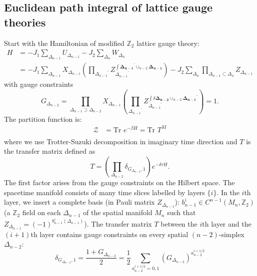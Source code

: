 \documentclass[12pt]{article}
\newcommand{\ZZ}{{\mathbb Z}}
\begin{document}
\subsection{Euclidean path integral of lattice gauge theories}

Start with the Hamiltonian of modified $\ZZ_2$ lattice gauge theory:
\begin{equation}
    \begin{split}
        H &= - J_1 \sum_{\Delta_{n-1}} U_{\Delta_{n-1}} - J_2 \sum_{\Delta_{n}} W_{\Delta_{n}} \\
        &= -J_1 \sum_{\Delta_{n-1}} X_{\Delta_{n-1}} (\prod_{{\Delta_{n-1}}^\prime} Z_{{\Delta_{n-1}}^\prime}^{\int \boldsymbol {\Delta_{n-1}}^\prime \cup_{n-2} \boldsymbol {\Delta_{n-1}}})
        - J_2 \sum_{\Delta_{n}} \prod_{\Delta_{n-1} \subset \Delta_n} Z_{\Delta_{n-1}}
    \end{split}
\end{equation}
with gauge constraints
\begin{equation}
    G_{\Delta_{n-2}} = \prod_{{\Delta_{n-1}} \supset {\Delta_{n-2}}} X_{\Delta_{n-1}}  (\prod_{{\Delta_{n-1}}^\prime} Z_{{\Delta_{n-1}}^\prime}^{\int \delta \boldsymbol {\Delta_{n-2}} \cup_{n-2} \boldsymbol {\Delta_{n-1}}^\prime})=1.
\end{equation}
The partition function is:
\begin{equation}
\begin{split}
\mathcal{Z} &=\text{Tr } e^{-\beta H} =  \text{Tr } T^M \\
\end{split}
\label{eq:partition function}
\end{equation}
where we use Trotter-Suzuki decomposition in imaginary time direction and $T$ is the transfer matrix defined as
\begin{equation}
T= \left(\prod_{\Delta_{n-2}} \delta_{G_{\Delta_{n-2}}, 1 }\right) e^{-\delta \tau H} .
\end{equation}
The first factor arises from the gauge constraints on the Hilbert space. The spacetime manifold consists of many time slices labelled by layers $\{i\}$. In the $i$th layer, we insert a complete basis (in Pauli matrix $Z_{\Delta_{n-1}}$):  $b^i_{n-1} \in C^{n-1}(M_n,\ZZ_2)$ (a $\ZZ_2$ field on each $\Delta_{n-1}$ of the spatial manifold $M_n$ such that $Z_{\Delta_{n-1}}=(-1)^{b^i_{n-1}(\Delta_{n-1})}$). The transfer matrix $T$ between the $i$th layer and the $(i+1)$th layer contains gauge constraints on every spatial $(n-2)$-simplex $\Delta_{n-2}$:
\begin{equation}
    \delta_{G_{\Delta_{n-2}}, 1 } = \frac{1+G_{\Delta_{n-2}}}{2}= \frac{1}{2} \sum_{a^{i+1/2}_{n-2}=0,1} (G_{\Delta_{n-2}})^{a^{i+1/2}_{n-2}}
\end{equation}
\end{document}

